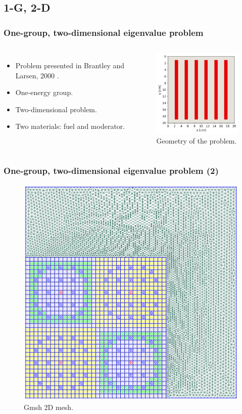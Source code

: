 \subsection{1-G, 2-D}

\begin{frame}
\frametitle{One-group, two-dimensional eigenvalue problem}

\begin{columns}
    \column[t]{4cm}
    \begin{itemize}
        \item Problem presented in Brantley and Larsen, 2000 \cite{brantley_simplifiedP3_2000}.
        \item One-energy group.
        \item Two-dimensional problem.
        \item Two materials: fuel and moderator.
    \end{itemize}

    \column[t]{6cm}
    \begin{figure}[htbp!]
        \begin{center}
            \includegraphics[width=6cm]{figures/mesh2}
        \end{center}
        \caption{Geometry of the problem.}
    \end{figure}
\end{columns}
\end{frame}


\begin{frame}
\frametitle{One-group, two-dimensional eigenvalue problem (2)}

    \begin{figure}[htbp!]
        \begin{center}
            \includegraphics[width=6.cm]{figures/bench-mesh}
        \end{center}
        \caption{Gmsh 2D mesh.}
    \end{figure}
\end{frame}


